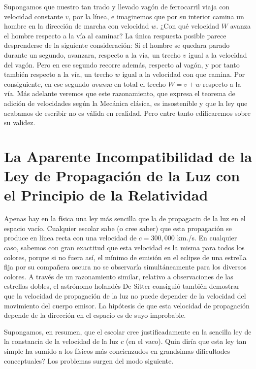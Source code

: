 \documentclass[spanish]{book}
\begin{document}
Supongamos que nuestro tan trado y llevado vagón de ferrocarril viaja con
velocidad constante $v$, por la línea, e imaginemos que por su interior camina un
hombre en la dirección de marcha con velocidad $w$. ¿Con qué velocidad $W$ avanza el
hombre respecto a la vía al caminar? La única respuesta posible parece desprenderse
de la siguiente consideración:
Si el hombre se quedara parado durante un segundo, avanzara, respecto a la vía, un
trecho $v$ igual a la velocidad del vagón. Pero en ese segundo recorre además, respecto
al vagón, y por tanto también respecto a la vía, un trecho $w$ igual a la velocidad con
que camina. Por consiguiente, en ese segundo \textit{avanza} en total el trecho
$W=v+w$ respecto a la vía. Más adelante veremos que este razonamiento, que expresa el teorema
de adición de velocidades según la Mecánica clásica, es insostenible y que la ley que
acabamos de escribir no es válida en realidad. Pero entre tanto edificaremos sobre su
validez.

\chapter{La Aparente Incompatibilidad de la Ley de Propagación de la Luz con
el Principio de la Relatividad}

Apenas hay en la física una ley más sencilla que la de propagacin de la luz en el
espacio vacío. Cualquier escolar sabe (o cree saber) que esta propagación se produce
en línea recta con una velocidad de $c=300,000$ km./s. En cualquier caso, sabemos
con gran exactitud que esta velocidad es la misma para todos los colores, porque si no
fuera así, el mínimo de emisión en el eclipse de una estrella fija por su compañera
oscura no se observaría simultáneamente para los diversos colores. A través de un
razonamiento similar, relativo a observaciones de las estrellas dobles, el astrónomo
holandés De Sitter consiguió también demostrar que la velocidad de propagación de la
luz no puede depender de la velocidad del movimiento del cuerpo emisor. La hipótesis
de que esta velocidad de propagación depende de la dirección en el espacio es de
suyo improbable.

Supongamos, en resumen, que el escolar cree justificadamente en la sencilla ley de la
constancia de la velocidad de la luz $c$ (en el vaco). Quin diría que esta ley tan simple
ha sumido a los físicos más concienzudos en grandsimas dificultades conceptuales? Los
problemas surgen del modo siguiente.
\end{document}
